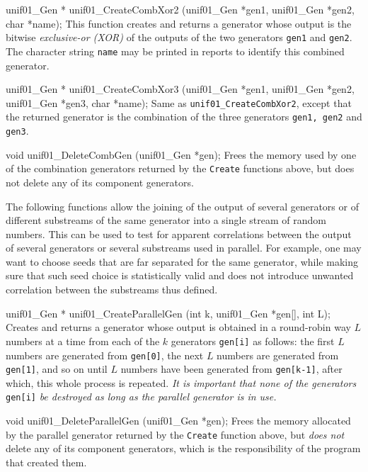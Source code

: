 unif01_Gen * unif01_CreateCombXor2 (unif01_Gen *gen1, unif01_Gen *gen2,
                                    char *name);
\endcode
 \tab  This function creates and returns a generator whose output is the
 bitwise {\sl exclusive-or (XOR)\/}  of the outputs of the two generators
 {\tt gen1} and {\tt gen2}. The character string {\tt name} may be printed
 in reports to identify this combined generator.
 \endtab
\code


unif01_Gen * unif01_CreateCombXor3 (unif01_Gen *gen1, unif01_Gen *gen2,
                                    unif01_Gen *gen3, char *name);
\endcode
 \tab  Same as {\tt unif01\_CreateCombXor2}, except that the
 returned generator is the combination of the three generators
 {\tt gen1, gen2} and {\tt gen3}.
 \endtab
\code


void unif01_DeleteCombGen (unif01_Gen *gen);
\endcode
 \tab  Frees the memory used by one of the combination generators returned
  by the  {\tt Create} functions above, but does not delete any of its
  component generators.
 \endtab



 The following functions allow the joining of the output of several generators
 or of different substreams of the same generator into a single stream of
 random numbers. This can be used to test for apparent correlations between the
 output of several generators or several substreams used in parallel.
 For example, one may want to choose seeds
 that are far separated for the same generator, while making sure that
 such seed choice is statistically valid and does not introduce unwanted
 correlation between the substreams thus defined.
\code

unif01_Gen * unif01_CreateParallelGen (int k, unif01_Gen *gen[], int L);
\endcode
 \tab Creates and returns a generator whose output is obtained in a round-robin
  way $L$ numbers at a time from each of the $k$ generators \texttt{gen[i]} as
  follows: the first $L$ numbers are generated from \texttt{gen[0]}, the next
  $L$ numbers are generated from \texttt{gen[1]}, and so on until
  $L$ numbers have been generated from \texttt{gen[k-1]}, after which, this whole
  process is repeated. \emph{It is important that none of the generators}
 \texttt{gen[i]} \emph{be destroyed as long as the parallel generator is in use.}
 \endtab
\code


void unif01_DeleteParallelGen (unif01_Gen *gen);
\endcode
 \tab  Frees the memory allocated by the parallel generator returned
  by the  {\tt Create} function above, but \emph{does not} delete any of its
  component generators, which is the responsibility of the program that
  created them.
 \endtab


